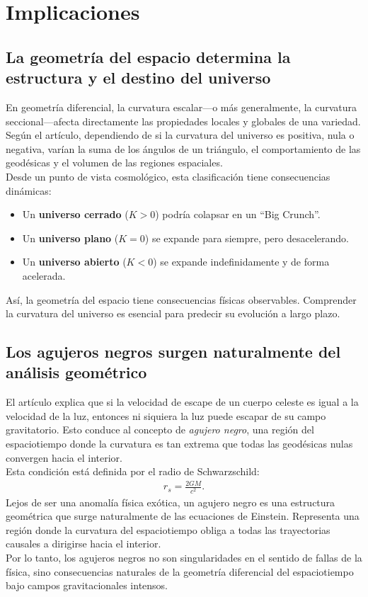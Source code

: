 \documentclass{aleph-revista}
\begin{document}
\section{Implicaciones}
\subsection*{La geometría del espacio determina la estructura y el destino del universo}
En geometría diferencial, la curvatura escalar—o más generalmente, la curvatura seccional—afecta directamente las propiedades locales y globales de una variedad. Según el artículo, dependiendo de si la curvatura del universo es positiva, nula o negativa, varían la suma de los ángulos de un triángulo, el comportamiento de las geodésicas y el volumen de las regiones espaciales.\\
Desde un punto de vista cosmológico, esta clasificación tiene consecuencias dinámicas:
\begin{itemize}
  \item Un \textbf{universo cerrado} ($K > 0$) podría colapsar en un “Big Crunch”.
  \item Un \textbf{universo plano} ($K = 0$) se expande para siempre, pero desacelerando.
  \item Un \textbf{universo abierto} ($K < 0$) se expande indefinidamente y de forma acelerada.
\end{itemize}
Así, la geometría del espacio tiene consecuencias físicas observables. Comprender la curvatura del universo es esencial para predecir su evolución a largo plazo.
\subsection*{Los agujeros negros surgen naturalmente del análisis geométrico}
El artículo explica que si la velocidad de escape de un cuerpo celeste es igual a la velocidad de la luz, entonces ni siquiera la luz puede escapar de su campo gravitatorio. Esto conduce al concepto de \textit{agujero negro}, una región del espaciotiempo donde la curvatura es tan extrema que todas las geodésicas nulas convergen hacia el interior.\\
Esta condición está definida por el radio de Schwarzschild:
\begin{align*}
r_s = \frac{2GM}{c^2}.
\end{align*}
Lejos de ser una anomalía física exótica, un agujero negro es una estructura geométrica que surge naturalmente de las ecuaciones de Einstein. Representa una región donde la curvatura del espaciotiempo obliga a todas las trayectorias causales a dirigirse hacia el interior.\\
Por lo tanto, los agujeros negros no son singularidades en el sentido de fallas de la física, sino consecuencias naturales de la geometría diferencial del espaciotiempo bajo campos gravitacionales intensos.
\end{document}
